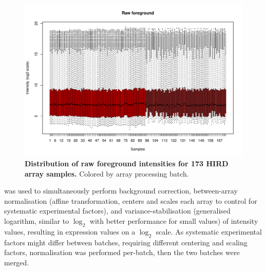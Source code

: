 \begin{figure}
    \centering
    \includegraphics[width=1.0\textwidth,page=1]{mainmatter/figures/chapter_02/array_data_setup.array_intensity_boxplots.pdf}
    \caption{
        \textbf{Distribution of raw foreground intensities for 173 \gls{HIRD} array samples.}
        Colored by array processing batch.
    }
    \label{fig:hird_array_boxplots_raw}
\end{figure}

%
 \autocite{huber2002VarianceStabilizationApplied} was used to simultaneously perform 
background correction, 
between-array normalisation (affine transformation, centers and scales each array to control for systematic experimental factors), 
and variance-stabilisation (generalised logarithm, similar to $\log_2$ with better performance for small values) of intensity values, 
resulting in expression values on a $\log_2$ scale.
As systematic experimental factors might differ between batches, requiring different centering and scaling factors, normalisation was performed per-batch, then the two batches were merged.

